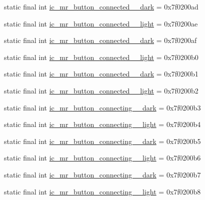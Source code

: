 \begin{CompactItemize}
\item 
static final int \hyperlink{classandroid_1_1support_1_1v7_1_1appcompat_1_1_r_1_1drawable_2babc96cebcbb084ba28348cc9ef8220}{ic\_\-mr\_\-button\_\-connected\_\_\-dark} = 0x7f0200ad
\item 
static final int \hyperlink{classandroid_1_1support_1_1v7_1_1appcompat_1_1_r_1_1drawable_c59145c095b50539dbf9ef3671f7414f}{ic\_\-mr\_\-button\_\-connected\_\_\-light} = 0x7f0200ae
\item 
static final int \hyperlink{classandroid_1_1support_1_1v7_1_1appcompat_1_1_r_1_1drawable_f5a851cbed38c438dbb6d4ffcd9cb970}{ic\_\-mr\_\-button\_\-connected\_\_\-dark} = 0x7f0200af
\item 
static final int \hyperlink{classandroid_1_1support_1_1v7_1_1appcompat_1_1_r_1_1drawable_05ee5e044a752579ce462312caef6294}{ic\_\-mr\_\-button\_\-connected\_\_\-light} = 0x7f0200b0
\item 
static final int \hyperlink{classandroid_1_1support_1_1v7_1_1appcompat_1_1_r_1_1drawable_0e26805f2660b45149aeb58fb026d127}{ic\_\-mr\_\-button\_\-connected\_\_\-dark} = 0x7f0200b1
\item 
static final int \hyperlink{classandroid_1_1support_1_1v7_1_1appcompat_1_1_r_1_1drawable_091773afd9fcbfe62cbc8375bb01f698}{ic\_\-mr\_\-button\_\-connected\_\_\-light} = 0x7f0200b2
\item 
static final int \hyperlink{classandroid_1_1support_1_1v7_1_1appcompat_1_1_r_1_1drawable_3779a1bb7ae02002d1c92d84bbe90b82}{ic\_\-mr\_\-button\_\-connecting\_\_\-dark} = 0x7f0200b3
\item 
static final int \hyperlink{classandroid_1_1support_1_1v7_1_1appcompat_1_1_r_1_1drawable_721e7cedf5be33d3c2e286fbfd483082}{ic\_\-mr\_\-button\_\-connecting\_\_\-light} = 0x7f0200b4
\item 
static final int \hyperlink{classandroid_1_1support_1_1v7_1_1appcompat_1_1_r_1_1drawable_9b62064a24c504f89f3e81c3a094503b}{ic\_\-mr\_\-button\_\-connecting\_\_\-dark} = 0x7f0200b5
\item 
static final int \hyperlink{classandroid_1_1support_1_1v7_1_1appcompat_1_1_r_1_1drawable_b10a2e707bca7cb75a375b2004aac1f6}{ic\_\-mr\_\-button\_\-connecting\_\_\-light} = 0x7f0200b6
\item 
static final int \hyperlink{classandroid_1_1support_1_1v7_1_1appcompat_1_1_r_1_1drawable_86c2d63f424a1d6b6a77972d4be45aee}{ic\_\-mr\_\-button\_\-connecting\_\_\-dark} = 0x7f0200b7
\item 
static final int \hyperlink{classandroid_1_1support_1_1v7_1_1appcompat_1_1_r_1_1drawable_68c827a0baab40930576a6f4ad404b93}{ic\_\-mr\_\-button\_\-connecting\_\_\-light} = 0x7f0200b8

\end{CompactItemize}
